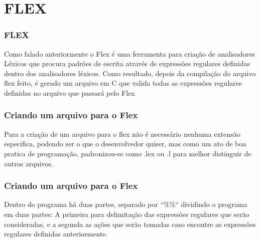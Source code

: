 \documentclass{beamer}
\begin{document}
\section{FLEX}			%
\begin{frame}
\frametitle{FLEX}
  Como falado anteriormente o Flex é uma ferramenta para criação de analisadores Léxicos que
 procura padrões de escrita através de expressões regulares definidas dentro dos analisadores léxicos.
  Como resultado, depois da compilação do arquivo flex feito, é gerado um arquivo em C que valida
 todas as expressões regulares definidas no arquivo que passará pelo Flex
 

\end{frame}

\begin{frame}
\frametitle{Criando um arquivo para o Flex}

  Para a criação de um arquivo para o flex não é necessário nenhuma extensão especifica, podendo ser 
 o que o desenvolvedor quiser, mas como um ato de boa pratica de programação, padronizou-se como .lex ou 
 .l para melhor distinguir de outros arquivos.

\end{frame}
\begin{frame}
\frametitle{Criando um arquivo para o Flex}

  Dentro do programa há duas partes, separado por ``\%\%`` dividindo o programa em duas partes: %
A primeira para delimitação das expressões regulares que serão consideradas, e a segunda as ações que serão
tomadas caso encontre as expressões regulares definidas anteriormente.
  
\end{frame}
\end{document}
